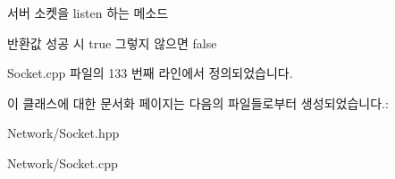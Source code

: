 서버 소켓을 listen 하는 메소드 

\begin{DoxyReturn}{반환값}
성공 시 true 그렇지 않으면 false 
\end{DoxyReturn}


Socket.\+cpp 파일의 133 번째 라인에서 정의되었습니다.



이 클래스에 대한 문서화 페이지는 다음의 파일들로부터 생성되었습니다.\+:\begin{DoxyCompactItemize}
\item 
Network/Socket.\+hpp\item 
Network/Socket.\+cpp\end{DoxyCompactItemize}
